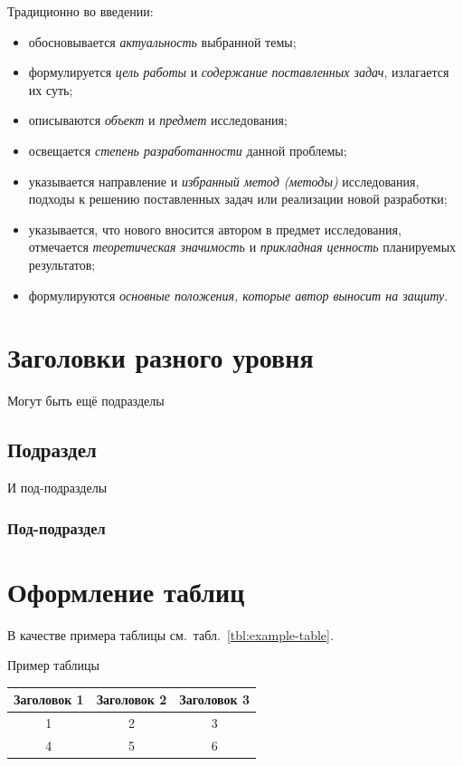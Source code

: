 \documentclass[PI,VKR]{HSEUniversity}
\begin{document}
Традиционно во введении:
\begin{itemize}
	\item  обосновывается \emph{актуальность} выбранной темы;
	\item  формулируется \emph{цель работы} и \emph{содержание поставленных задач}, излагается их суть;
	\item  описываются \emph{объект} и \emph{предмет} исследования;
	\item  освещается \emph{степень разработанности} данной проблемы;
	\item  указывается направление и \emph{избранный метод (методы)} исследования, подходы к решению поставленных задач или реализации новой разработки;
	\item  указывается, что нового вносится автором в предмет исследования, отмечается \emph{теоретическая значимость} и \emph{прикладная ценность} планируемых результатов;
	\item  формулируются \emph{основные положения, которые автор выносит на защиту}.
\end{itemize}

\section{Заголовки разного уровня}

\lipsum[2]

Могут быть ещё подразделы

\subsection{Подраздел}

\lipsum[2]

И под-подразделы

\subsubsection{Под-подраздел}
\lipsum[2]

\section{Оформление таблиц} 
%
В качестве примера таблицы см.~табл.~\ref{tbl:example-table}.

\begin{TABLE}[H]{Пример таблицы\label{tbl:example-table}}
	\begin{tabular}{|c|c|c|}
		\hline
		Заголовок 1 & Заголовок 2 & Заголовок 3 \\ \hline %
		1 & 2 & 3 \\ \hline
		4 & 5 & 6 \\ \hline
	\end{tabular}
\end{TABLE}
\end{document}
